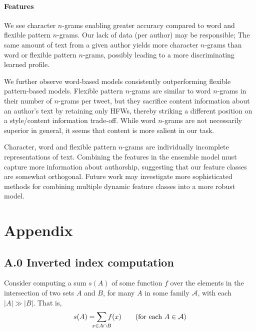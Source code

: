 \documentclass[twocolumn,10pt]{article}
\begin{document}
\paragraph{Features}

We see character $n$-grams enabling greater accuracy compared to word
and flexible pattern $n$-grams.
Our lack of data (per author) may be responsible;
The same amount of text from a given author yields more character $n$-grams
than word or flexible pattern $n$-grams, possibly leading to a more
discriminating learned profile.

We further observe word-based models consistently outperforming
flexible pattern-based models. Flexible pattern $n$-grams are similar to
word $n$-grams in their number of $n$-grams per tweet, but they
sacrifice content information about an author's text by retaining only HFWs,
thereby striking a different position on a style/content information
trade-off. 
While word $n$-grams are not necessarily superior in general, it seems
that content is more salient in our task.

Character, word and flexible pattern $n$-grams are individually
incomplete representations of text.
Combining the features in the ensemble model must capture more
information about authorship, suggesting that our feature classes
are somewhat orthogonal.
Future work may investigate more sophisticated methods for
combining multiple dynamic feature classes into a more robust model. 


\printbibliography

\section{Appendix}

\subsection*{A.0 Inverted index computation}
\label{ax:invertedindex}

Consider computing a sum $s(A)$ of some function $f$ over the elements
in the intersection of two sets $A$ and $B$, for many $A$ in some
family $\mathcal{A}$, with each $|A| \gg |B|$. That is,
$$
s(A)
    = \smashoperator{\sum_{x \in A \cap B}} f(x)
\qquad (\text{for each } A \in \mathcal{A})
$$
\end{document}
